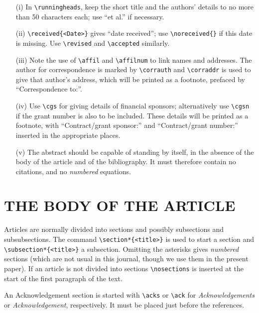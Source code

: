 \documentclass{speauth}
\begin{document}
\begin{enumerate}
\item[(i)]
In \verb"\runningheads", keep the short title and the authors' details
to no more than 50 characters each; use ``et al.'' if necessary.
\item[(ii)]
\verb"\received{<Date>}" gives ``date received'';
use \verb"\noreceived{}" if this date is missing.
Use \verb"\revised" and \verb"\accepted" similarly.
\item[(iii)]
Note the use of \verb"\affil" and \verb"\affilnum"
to link names and addresses.
The author for correspondence is marked by \verb"\corrauth"
and \verb"\corraddr" is used to give that author's address,
which will be printed as a footnote, prefaced by ``Correspondence to:''.
\item[(iv)]
Use \verb"\cgs" for giving details of financial sponsors; alternatively
use \verb"\cgsn" if the grant number is also to be included.
These details will be printed as a footnote,
with ``Contract/grant sponsor:'' and ``Contract/grant number:''
inserted in the appropriate places.
\item[(v)]
The abstract should be capable of standing by itself, in the absence
of the body of the article and of the bibliography.  It must therefore
contain no citations, and no \emph{numbered} equations.

\end{enumerate}

\section{THE BODY OF THE ARTICLE}
Articles are normally divided into sections
and possibly subsections and subsubsections.
The command \verb"\section*{<title>}" is used to start a section
and \verb"\subsection*{<title>}" a subsection.
Omitting the asterisks gives \emph{numbered} sections
(which are not usual in this journal,
though we use them in the present paper). %
If an article is not divided into sections \verb"\nosections" is inserted
at the start of the first paragraph of the text.

An Acknowledgement section is started with \verb"\acks" or \verb"\ack"
for \textit{Acknowledgements} or \textit{Acknowledgement}, respectively.
It must be placed just before the references.
\end{document}
